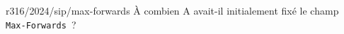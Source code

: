 \begin{question}{r316/2024/sip/max-forwards}
  À combien A avait-il initialement fixé le champ {\tt
    Max-Forwards}~?
  \begin{reponses}
    \lastchoices
  \end{reponses}
\end{question}